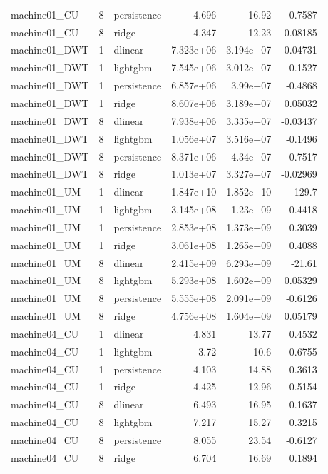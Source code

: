 \begin{table}
\begin{tabular}{lrlrrr}
machine01_CU & 8 & persistence & 4.696 & 16.92 & -0.7587 \\
machine01_CU & 8 & ridge & 4.347 & 12.23 & 0.08185 \\
machine01_DWT & 1 & dlinear & 7.323e+06 & 3.194e+07 & 0.04731 \\
machine01_DWT & 1 & lightgbm & 7.545e+06 & 3.012e+07 & 0.1527 \\
machine01_DWT & 1 & persistence & 6.857e+06 & 3.99e+07 & -0.4868 \\
machine01_DWT & 1 & ridge & 8.607e+06 & 3.189e+07 & 0.05032 \\
machine01_DWT & 8 & dlinear & 7.938e+06 & 3.335e+07 & -0.03437 \\
machine01_DWT & 8 & lightgbm & 1.056e+07 & 3.516e+07 & -0.1496 \\
machine01_DWT & 8 & persistence & 8.371e+06 & 4.34e+07 & -0.7517 \\
machine01_DWT & 8 & ridge & 1.013e+07 & 3.327e+07 & -0.02969 \\
machine01_UM & 1 & dlinear & 1.847e+10 & 1.852e+10 & -129.7 \\
machine01_UM & 1 & lightgbm & 3.145e+08 & 1.23e+09 & 0.4418 \\
machine01_UM & 1 & persistence & 2.853e+08 & 1.373e+09 & 0.3039 \\
machine01_UM & 1 & ridge & 3.061e+08 & 1.265e+09 & 0.4088 \\
machine01_UM & 8 & dlinear & 2.415e+09 & 6.293e+09 & -21.61 \\
machine01_UM & 8 & lightgbm & 5.293e+08 & 1.602e+09 & 0.05329 \\
machine01_UM & 8 & persistence & 5.555e+08 & 2.091e+09 & -0.6126 \\
machine01_UM & 8 & ridge & 4.756e+08 & 1.604e+09 & 0.05179 \\
machine04_CU & 1 & dlinear & 4.831 & 13.77 & 0.4532 \\
machine04_CU & 1 & lightgbm & 3.72 & 10.6 & 0.6755 \\
machine04_CU & 1 & persistence & 4.103 & 14.88 & 0.3613 \\
machine04_CU & 1 & ridge & 4.425 & 12.96 & 0.5154 \\
machine04_CU & 8 & dlinear & 6.493 & 16.95 & 0.1637 \\
machine04_CU & 8 & lightgbm & 7.217 & 15.27 & 0.3215 \\
machine04_CU & 8 & persistence & 8.055 & 23.54 & -0.6127 \\
machine04_CU & 8 & ridge & 6.704 & 16.69 & 0.1894 \\

\end{tabular}
\end{table}
